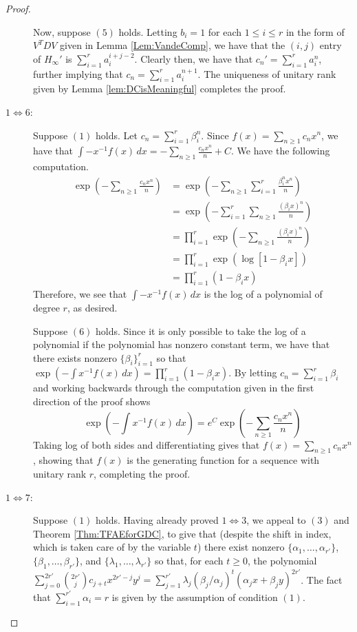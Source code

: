 \documentclass[12pt,reqno]{article}
\begin{document}
\begin{proof}
\begin{description}
Now, suppose $(5)$ holds. Letting $b_i = 1$ for each $1\leq i\leq r$ in the form of $V^TDV$ given in Lemma \ref{Lem:VandeComp}, we have that the $(i,j)$ entry of $H_\infty'$ is $\sum_{i=1}^r a_i^{i+j-2}$. Clearly then, we have that $c_n' = \sum_{i=1}^r a_i^n$, further implying that $c_n = \sum_{i=1}^r a_i^{n+1}$. The uniqueness of unitary rank given by Lemma \ref{lem:DCisMeaningful} completes the proof. 

\item[$1\Leftrightarrow 6$:] Suppose $(1)$ holds. Let $c_n = \sum_{i=1}^r \beta_i^{n}$. Since $f(x) = \sum_{n\geq 1} c_nx^n$, we have that $\int -x^{-1} f(x) \, dx = -\sum_{n\geq 1} \frac{c_n x^{n}}{n} + C$. We have the following computation.  
\begin{align*}
\exp \left( -\sum_{n\geq 1} \frac{c_n x^{n}}{n} \right) &= \exp \left( - \sum_{n\geq 1} \sum_{i=1}^r \frac{\beta_i^{n} x^{n}}{n} \right) \\
&= \exp \left( - \sum_{i=1}^r \sum_{n\geq 1} \frac{(\beta_ix)^{n}}{n} \right) \\
&= \prod_{i=1}^r \exp \left( - \sum_{n\geq 1} \frac{(\beta_ix)^n}{n} \right) \\
&= \prod_{i=1}^r \exp \left( \log[1-\beta_i x] \right) \\
&= \prod_{i=1}^r (1-\beta_i x)
\end{align*}
Therefore, we see that $\int -x^{-1} f(x) \, dx$ is the log of a polynomial of degree $r$, as desired. 

Suppose $(6)$ holds. Since it is only possible to take the log of a polynomial if the polynomial has nonzero constant term, we have that there exists nonzero $\{\beta_i\}_{i=1}^r$ so that $\exp(-\int x^{-1} f(x) \, dx) = \prod_{i=1}^r (1-\beta_i x)$. By letting $c_n = \sum_{i=1}^r \beta_i$ and working backwards through the computation given in the first direction of the proof shows 
$$
\exp \left( -\int x^{-1} f(x) \, dx \right) = e^C \exp \left(- \sum_{n\geq 1} \frac{c_n x^{n}}{n} \right)
$$
Taking log of both sides and differentiating gives that $f(x) = \sum_{n\geq 1} c_n x^{n}$, showing that $f(x)$ is the generating function for a sequence with unitary rank $r$, completing the proof. 

\item[$1 \Leftrightarrow 7$:] Suppose $(1)$ holds. Having already proved $1\Leftrightarrow 3$, we appeal to $(3)$ and Theorem \ref{Thm:TFAEforGDC}, to give that (despite the shift in index, which is taken care of by the variable $t$) there exist nonzero $\{\alpha_1,\ldots,\alpha_{r'}\}$, $\{\beta_1,\ldots,\beta_{r'}\}$, and $\{\lambda_1,\ldots,\lambda_{r'}\}$ so that, for each $t \geq 0$, the polynomial $\sum_{j=0}^{2r'} \binom{2r'}{j} c_{j+t} x^{2r'-j} y^{j} = \sum_{j=1}^{r'} \lambda_j (\beta_j/\alpha_j)^t (\alpha_j x + \beta_j y)^{2r'}$. The fact that $\sum_{i=1}^{r'} \alpha_i = r$ is given by the assumption of condition $(1)$. 


\end{description}
\end{proof}
\end{document}
